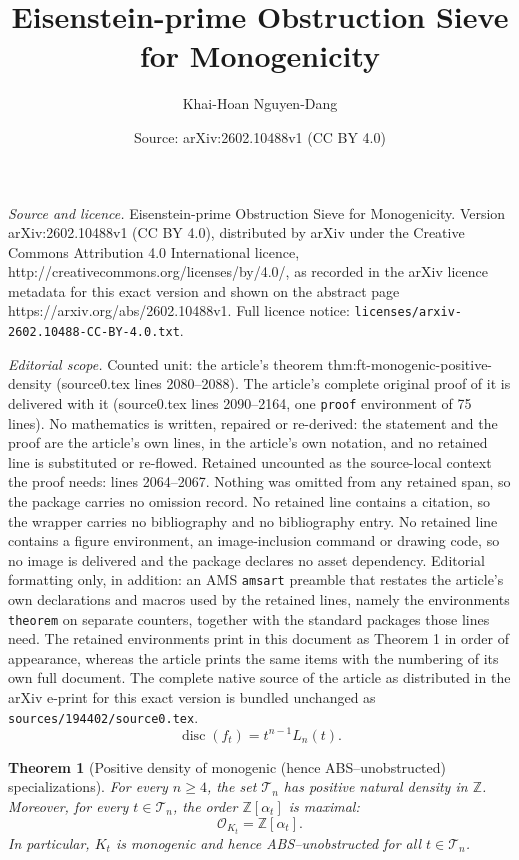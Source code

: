 \documentclass[10pt,a4paper]{amsart}
\title{Eisenstein-prime Obstruction Sieve for Monogenicity}
\author{Khai-Hoan Nguyen-Dang}
\date{Source: arXiv:2602.10488v1 (CC BY 4.0)}
\newtheorem{theorem}{Theorem}
\newcommand{\Ocal}{\mathcal{O}}
\newcommand{\Z}{\mathbb{Z}}
\newcommand{\disc}{\operatorname{disc}}
\begin{document}
\maketitle

\noindent\emph{Source and licence.} Eisenstein-prime Obstruction Sieve for Monogenicity. Version arXiv:2602.10488v1 (CC BY 4.0), distributed by arXiv under the Creative Commons Attribution 4.0 International licence, http://creativecommons.org/licenses/by/4.0/, as recorded in the arXiv licence metadata for this exact version and shown on the abstract page https://arxiv.org/abs/2602.10488v1. Full licence notice: \texttt{licenses/arxiv-2602.10488-CC-BY-4.0.txt}.\par\smallskip

\noindent\textit{Editorial scope.} Counted unit: the article's theorem thm:ft-monogenic-positive-density (source0.tex lines 2080--2088). The article's complete original proof of it is delivered with it (source0.tex lines 2090--2164, one \texttt{proof} environment of 75 lines). No mathematics is written, repaired or re-derived: the statement and the proof are the article's own lines, in the article's own notation, and no retained line is substituted or re-flowed.  Retained uncounted as the source-local context the proof needs: lines 2064--2067.  Nothing was omitted from any retained span, so the package carries no omission record.  No retained line contains a citation, so the wrapper carries no bibliography and no bibliography entry.  No retained line contains a figure environment, an image-inclusion command or drawing code, so no image is delivered and the package declares no asset dependency.  Editorial formatting only, in addition: an AMS \texttt{amsart} preamble that restates the article's own declarations and macros used by the retained lines, namely the environments \texttt{theorem} on separate counters, together with the standard packages those lines need.  The retained environments print in this document as Theorem 1 in order of appearance, whereas the article prints the same items with the numbering of its own full document.  The complete native source of the article as distributed in the arXiv e-print for this exact version is bundled unchanged as \texttt{sources/194402/source0.tex}.
\begin{equation}
\label{eq:disc-ft}
\disc(f_t)=t^{n-1}L_n(t).
\end{equation}

\begin{theorem}[Positive density of monogenic (hence \textsc{ABS}--unobstructed) specializations]
\label{thm:ft-monogenic-positive-density}
For every $n\ge 4$, the set $\mathcal T_n$ has positive natural density in $\Z$.
Moreover, for every $t\in\mathcal T_n$, the order $\Z[\alpha_t]$ is maximal:
\[
\Ocal_{K_t}=\Z[\alpha_t].
\]
In particular, $K_t$ is monogenic and hence \textsc{ABS}--unobstructed for all $t\in\mathcal T_n$.
\end{theorem}
\end{document}
